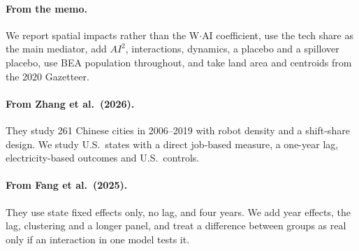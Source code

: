 \paragraph{From the memo.} We report spatial impacts rather than the W$\cdot$AI coefficient, use the tech share as the main mediator, add $AI^2$, interactions, dynamics, a placebo and a spillover placebo, use BEA population throughout, and take land area and centroids from the 2020 Gazetteer.

\paragraph{From Zhang et al.\ (2026).} They study 261 Chinese cities in 2006--2019 with robot density and a shift-share design. We study U.S.\ states with a direct job-based measure, a one-year lag, electricity-based outcomes and U.S.\ controls.

\paragraph{From Fang et al.\ (2025).} They use state fixed effects only, no lag, and four years. We add year effects, the lag, clustering and a longer panel, and treat a difference between groups as real only if an interaction in one model tests it.
